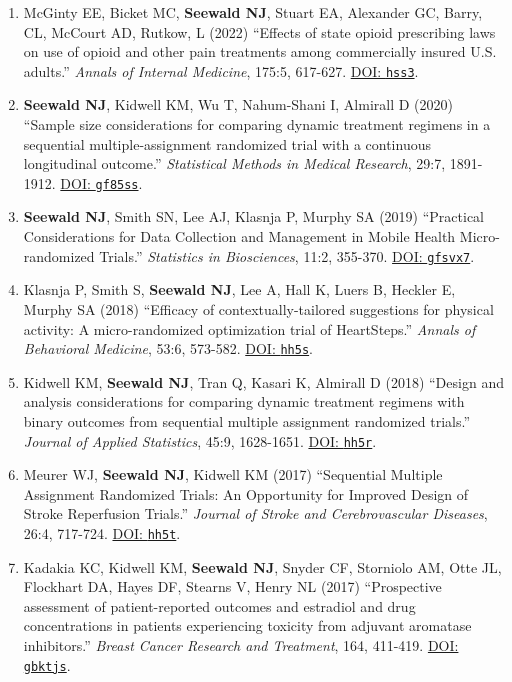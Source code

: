 \documentclass[letterpaper,11pt]{article} %
\begin{document}
\begin{enumerate}
		\item McGinty EE, Bicket MC, \textbf{Seewald NJ}, Stuart EA, Alexander GC, Barry, CL, McCourt AD, Rutkow, L (2022) ``Effects of state opioid prescribing laws on use of opioid and other pain treatments among commercially insured U.S. adults.'' \textit{Annals of Internal Medicine}, 175:5, 617-627. \href{https://doi.org/hss3}{DOI: \texttt{hss3}}.
		
        \item\textbf{Seewald NJ}, Kidwell KM, Wu T, Nahum-Shani I, Almirall D (2020) ``Sample size considerations for comparing dynamic treatment regimens in a sequential multiple-assignment randomized trial with a continuous longitudinal outcome.'' \textit{Statistical Methods in Medical Research}, 29:7, 1891-1912. \href{https://doi.org/gf85ss}{DOI: \texttt{gf85ss}}.
        
		\item \textbf{Seewald NJ}, Smith SN, Lee AJ, Klasnja P, Murphy SA (2019) ``Practical Considerations for Data Collection and Management in Mobile Health Micro-randomized Trials.'' \textit{Statistics in Biosciences}, 11:2, 355-370. \href{https://doi.org/gfsvx7}{DOI: \texttt{gfsvx7}}.
		
		\item Klasnja P, Smith S, \textbf{Seewald NJ}, Lee A, Hall K, Luers B, Heckler E, Murphy SA (2018) ``Efficacy of contextually-tailored suggestions for physical activity: A micro-randomized optimization trial of HeartSteps.'' \textit{Annals of Behavioral Medicine}, 53:6, 573-582. \href{https://doi.org/hh5s}{DOI: \texttt{hh5s}}.
			
		\item Kidwell KM, \textbf{Seewald NJ}, Tran Q, Kasari K, Almirall D (2018) ``Design and analysis considerations for comparing dynamic treatment regimens with binary outcomes from sequential multiple assignment randomized trials.'' \textit{Journal of Applied Statistics}, 45:9, 1628-1651. \href{https://doi.org/hh5r}{DOI: \texttt{hh5r}}.
		
		\item Meurer WJ, \textbf{Seewald NJ}, Kidwell KM (2017) ``Sequential Multiple Assignment Randomized Trials: An Opportunity for Improved Design of Stroke Reperfusion Trials.'' \textit{Journal of Stroke and Cerebrovascular Diseases}, 26:4, 717-724. \href{https://doi.org/hh5t}{DOI: \texttt{hh5t}}.
			
		\item Kadakia KC, Kidwell KM, \textbf{Seewald NJ}, Snyder CF, Storniolo AM, Otte JL, Flockhart DA, Hayes DF, Stearns V, Henry NL (2017) ``Prospective assessment of patient-reported outcomes and estradiol and drug concentrations in patients experiencing toxicity from adjuvant aromatase inhibitors.'' \textit{Breast Cancer Research and Treatment}, 164, 411-419. \href{https://doi.org/gbktjs}{DOI: \texttt{gbktjs}}.


\end{enumerate}
\end{document}
